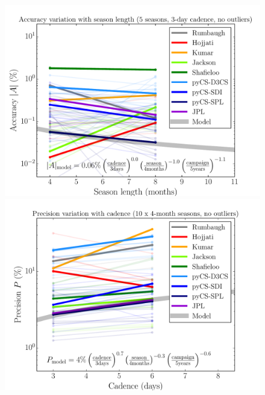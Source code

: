 \begin{figure}[!ht]
  \capstart
  \begin{minipage}[b]{\linewidth}
    \begin{minipage}[b]{0.32\linewidth}
      \centering\includegraphics[width=\linewidth]{figs/Accuracy_season_nca.pdf}
    \end{minipage} \hfill
    \begin{minipage}[b]{0.32\linewidth}
      \centering\includegraphics[width=\linewidth]{figs/Precision_cadence_nca.pdf}
    \end{minipage} \hfill
    \begin{minipage}[b]{0.32\linewidth}

\end{minipage}
\end{minipage}
\end{figure}
